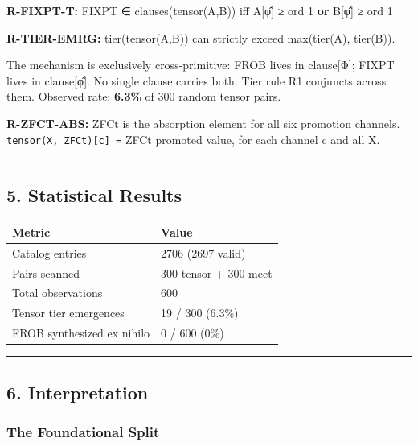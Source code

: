 \textbf{R-FIXPT-T:} FIXPT ∈ clauses(tensor(A,B)) iff A{[}φ̂{]} ≥ ord 1
\textbf{or} B{[}φ̂{]} ≥ ord 1

\textbf{R-TIER-EMRG:} tier(tensor(A,B)) can strictly exceed max(tier(A),
tier(B)).

The mechanism is exclusively cross-primitive: FROB lives in
clause{[}Φ{]}; FIXPT lives in clause{[}φ̂{]}. No single clause carries
both. Tier rule R1 conjuncts across them. Observed rate: \textbf{6.3\%}
of 300 random tensor pairs.

\textbf{R-ZFCT-ABS:} ZFCt is the absorption element for all six
promotion channels. \texttt{tensor(X,\ ZFCt){[}c{]}\ =} ZFCt promoted
value, for each channel c and all X.

\begin{center}\rule{0.5\linewidth}{0.5pt}\end{center}

\subsection{5. Statistical Results}\label{statistical-results}

{\def\LTcaptype{none} %
\begin{longtable}[]{@{}ll@{}}
\toprule\noalign{}
Metric & Value \\
\midrule\noalign{}
\endhead
\bottomrule\noalign{}
\endlastfoot
Catalog entries & 2706 (2697 valid) \\
Pairs scanned & 300 tensor + 300 meet \\
Total observations & 600 \\
Tensor tier emergences & 19 / 300 (6.3\%) \\
FROB synthesized ex nihilo & 0 / 600 (0\%) \\
\end{longtable}
}

\begin{center}\rule{0.5\linewidth}{0.5pt}\end{center}

\subsection{6. Interpretation}\label{interpretation}

\subsubsection{The Foundational Split}\label{the-foundational-split}

